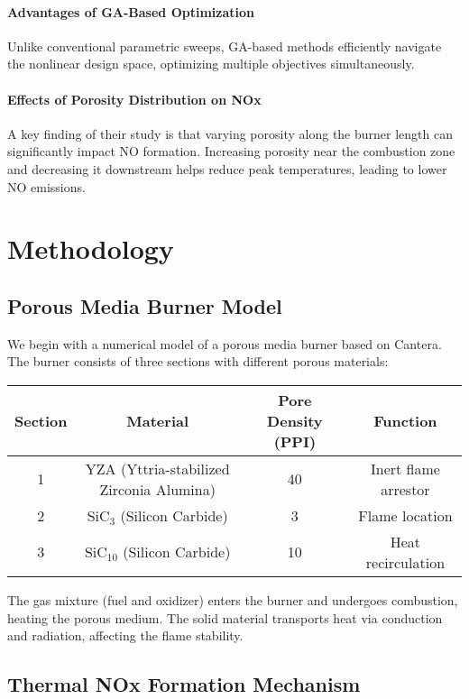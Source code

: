 \documentclass[12pt]{report}
\begin{document}
\subsubsection{Advantages of GA-Based Optimization}
Unlike conventional parametric sweeps, GA-based methods efficiently navigate the nonlinear design space, optimizing multiple objectives simultaneously.

\subsubsection{Effects of Porosity Distribution on NOx}
A key finding of their study is that varying porosity along the burner length can significantly impact NO formation. Increasing porosity near the combustion zone and decreasing it downstream helps reduce peak temperatures, leading to lower NO emissions.



\chapter{Methodology}

\section{Porous Media Burner Model}
We begin with a numerical model of a porous media burner based on Cantera. The burner consists of three sections with different porous materials:

\begin{center}
\begin{tabular}{|c|c|c|c|}
    \hline
    Section & Material & Pore Density (PPI) & Function \\
    \hline
    1 & YZA (Yttria-stabilized Zirconia Alumina) & 40 & Inert flame arrestor \\
    2 & SiC$_{3}$ (Silicon Carbide) & 3 & Flame location \\
    3 & SiC$_{10}$ (Silicon Carbide) & 10 & Heat recirculation \\
    \hline
\end{tabular}
\end{center}

The gas mixture (fuel and oxidizer) enters the burner and undergoes combustion, heating the porous medium. The solid material transports heat via conduction and radiation, affecting the flame stability.
\section{Thermal NOx Formation Mechanism}
\end{document}
